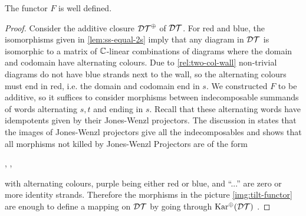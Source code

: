 \begin{lemma}
    The functor $F$ is well defined.
\end{lemma}
\begin{proof} 
    Consider the additive closure $\mathcal{DT}^\oplus$ of $\mathcal{DT}$. For red and blue, the isomorphisms given in \autoref{lem:ss-equal-2s} imply that any diagram in $\mathcal{DT}$ is isomorphic to a matrix of $\mathbb{C}$-linear combinations of diagrams where the domain and codomain have alternating colours. Due to \eqref{rel:two-col-wall} non-trivial diagrams do not have blue strands next to the wall, so the alternating colours must end in red, i.e. the domain and codomain end in $s$. We constructed $F$ to be additive, so it suffices to consider morphisms between indecomposable summands of words alternating $s,t$ and ending in $s$. Recall that these alternating words have idempotents given by their Jones-Wenzl projectors. The discussion in \cite[Section 5.4.2]{elias-dihedral-cathedral} states that the images of Jones-Wenzl projectors give all the indecomposables  and \cite[Corollary 4.21]{anderson-tubbenhauer-tilt} shows that all morphisms not killed by Jones-Wenzl Projectors are of the form
    \begin{center}
        \quad , \quad
        \quad , \quad
    \end{center}
    with alternating colours, purple being either red or blue, and ``...'' are zero or more identity strands. Therefore the morphisms in the picture \eqref{img:tilt-functor} are enough to define a mapping on $\mathcal{DT}$ by going through $\operatorname{Kar^\oplus}(\mathcal{DT})$ .


\end{proof}
